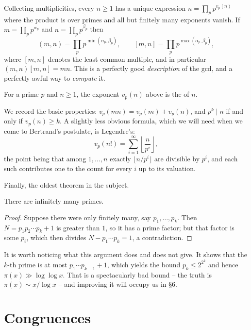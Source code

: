\documentclass[a4paper]{scrartcl}
\begin{document}
\begin{remark}
	Collecting multiplicities, every $n \geq 1$ has a unique expression $n = \prod_p p^{v_p(n)}$ where the product is over primes and all but finitely many exponents vanish. If $m = \prod_p p^{\alpha_p}$ and $n = \prod_p p^{\beta_p}$ then
	$$
	(m, n) = \prod_p p^{\min(\alpha_p, \beta_p)}, \qquad [m, n] = \prod_p p^{\max(\alpha_p, \beta_p)},
	$$
	where $[m,n]$ denotes the least common multiple, and in particular $(m,n)[m,n] = mn$. This is a perfectly good \emph{description} of the gcd, and a perfectly awful way to \emph{compute} it.
\end{remark}

\begin{definition}
	For a prime $p$ and $n \geq 1$, the exponent $v_p(n)$ above is the  of $n$.
\end{definition}

We record the basic properties: $v_p(mn) = v_p(m) + v_p(n)$, and $p^k \mid n$ if and only if $v_p(n) \geq k$. A slightly less obvious formula, which we will need when we come to Bertrand's postulate, is Legendre's:
$$
v_p(n!) = \sum_{i = 1}^\infty \left\lfloor \frac{n}{p^i} \right\rfloor,
$$
the point being that among $1, \dots, n$ exactly $\lfloor n/p^i \rfloor$ are divisible by $p^i$, and each such contributes one to the count for every $i$ up to its valuation.

Finally, the oldest theorem in the subject.

\begin{theorem}[Euclid]
	There are infinitely many primes.
\end{theorem}
\begin{proof}
	Suppose there were only finitely many, say $p_1, \dots, p_k$. Then $N = p_1 p_2 \cdots p_k + 1$ is greater than $1$, so it has a prime factor; but that factor is some $p_i$, which then divides $N - p_1 \cdots p_k = 1$, a contradiction.
\end{proof}

\begin{remark}
	It is worth noticing what this argument does and does not give. It shows that the $k$-th prime is at most $p_1 \cdots p_{k-1} + 1$, which yields the bound $p_k \leq 2^{2^k}$ and hence $\pi(x) \gg \log \log x$. That is a spectacularly bad bound -- the truth is $\pi(x) \sim x/\log x$ -- and improving it will occupy us in \S6.
\end{remark}

\section{Congruences}
\end{document}
